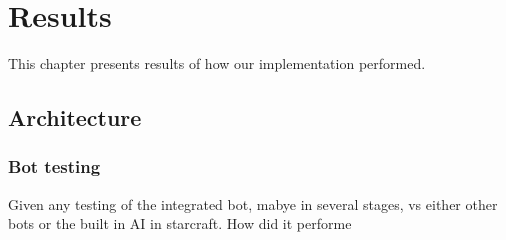 
\chapter{Results}
This chapter presents results of how our implementation performed.
\section{Architecture}
\label{sec:architecture}



\subsection{Bot testing}
Given any testing of the integrated bot, mabye in several stages, vs either other bots or the built in AI in starcraft. How did it performe
